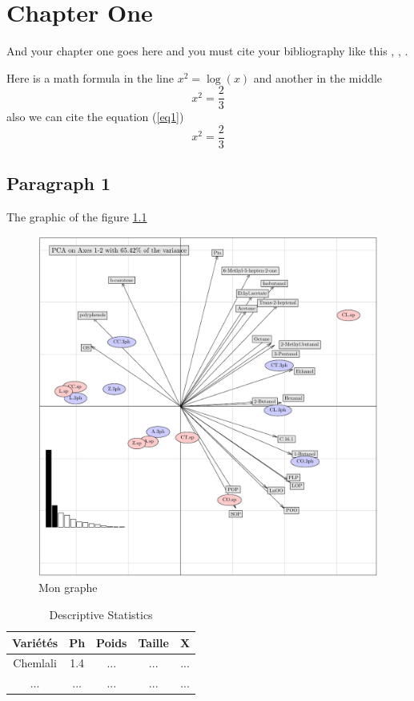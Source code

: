 \documentclass[12pt]{thesis}
\begin{document}
\renewcommand{\chaptername}{Chapter} 
\chapter{Chapter One}

And your chapter one goes here and you must cite your bibliography like this \cite{schaeffer99}, \cite{jenkins2004}, \cite{caillois1}.

Here is a math formula in the line $x^2=\log(x)$ and another in the middle
$$x^2=\displaystyle\frac{2}{3}$$
also we can cite the equation (\ref{eq1})
\begin{equation}
x^2=\displaystyle\frac{2}{3} \label{eq1}
\end{equation}
\section{Paragraph 1}

The graphic of the figure \ref{fig1}

\begin{figure}[h]
\centering
\includegraphics[scale=.5]{acp1}
\caption{Mon graphe \label{fig1}}
\end{figure}

\begin{table}[]
    \centering
    \begin{tabular}{|c||c|c|c|c|}
    \hline
        Variétés & Ph & Poids& Taille& X \\ \hline
        Chemlali & 1.4 & ... & ... &... \\ \hline
        ... & ... & ... &...  &... \\ \hline
    \end{tabular}
    \caption{Descriptive Statistics}
    \label{tab:my_label}
\end{table}




%
 
\end{document}
